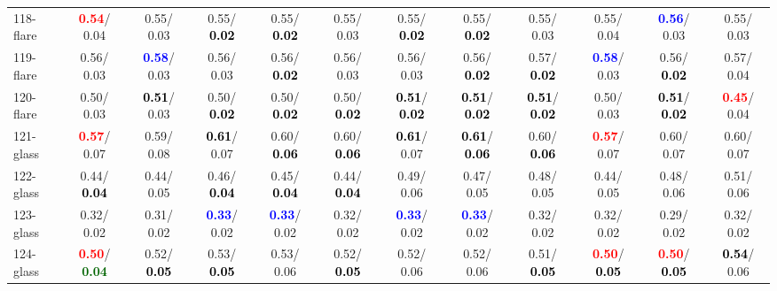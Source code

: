 \begin{table}[h]
\begin{center}
{\begin{tabular}{lc|c|c|c|c|c|c|c|c|c|c}
118-flare & \textcolor{red}{\textbf{  0.54}}/  0.04 &   0.55/  0.03 &   0.55/\textcolor{black}{\textbf{  0.02}} &   0.55/\textcolor{black}{\textbf{  0.02}} &   0.55/  0.03 &   0.55/\textcolor{black}{\textbf{  0.02}} &   0.55/\textcolor{black}{\textbf{  0.02}} &   0.55/  0.03 &   0.55/  0.04 & \textcolor{blue}{\textbf{  0.56}}/  0.03 &   0.55/  0.03 \\
119-flare &   0.56/  0.03 & \textcolor{blue}{\textbf{  0.58}}/  0.03 &   0.56/  0.03 &   0.56/\textcolor{black}{\textbf{  0.02}} &   0.56/  0.03 &   0.56/  0.03 &   0.56/\textcolor{black}{\textbf{  0.02}} &   0.57/\textcolor{black}{\textbf{  0.02}} & \textcolor{blue}{\textbf{  0.58}}/  0.03 &   0.56/\textcolor{black}{\textbf{  0.02}} &   0.57/  0.04 \\
120-flare &   0.50/  0.03 & \textcolor{black}{\textbf{  0.51}}/  0.03 &   0.50/\textcolor{black}{\textbf{  0.02}} &   0.50/\textcolor{black}{\textbf{  0.02}} &   0.50/\textcolor{black}{\textbf{  0.02}} & \textcolor{black}{\textbf{  0.51}}/\textcolor{black}{\textbf{  0.02}} & \textcolor{black}{\textbf{  0.51}}/\textcolor{black}{\textbf{  0.02}} & \textcolor{black}{\textbf{  0.51}}/\textcolor{black}{\textbf{  0.02}} &   0.50/  0.03 & \textcolor{black}{\textbf{  0.51}}/\textcolor{black}{\textbf{  0.02}} & \textcolor{red}{\textbf{  0.45}}/  0.04 \\
121-glass & \textcolor{red}{\textbf{  0.57}}/  0.07 &   0.59/  0.08 & \textcolor{black}{\textbf{  0.61}}/  0.07 &   0.60/\textcolor{black}{\textbf{  0.06}} &   0.60/\textcolor{black}{\textbf{  0.06}} & \textcolor{black}{\textbf{  0.61}}/  0.07 & \textcolor{black}{\textbf{  0.61}}/\textcolor{black}{\textbf{  0.06}} &   0.60/\textcolor{black}{\textbf{  0.06}} & \textcolor{red}{\textbf{  0.57}}/  0.07 &   0.60/  0.07 &   0.60/  0.07 \\
122-glass &   0.44/\textcolor{black}{\textbf{  0.04}} &   0.44/  0.05 &   0.46/\textcolor{black}{\textbf{  0.04}} &   0.45/\textcolor{black}{\textbf{  0.04}} &   0.44/\textcolor{black}{\textbf{  0.04}} &   0.49/  0.06 &   0.47/  0.05 &   0.48/  0.05 &   0.44/  0.05 &   0.48/  0.06 &   0.51/  0.06 \\
123-glass &   0.32/  0.02 &   0.31/  0.02 & \textcolor{blue}{\textbf{  0.33}}/  0.02 & \textcolor{blue}{\textbf{  0.33}}/  0.02 &   0.32/  0.02 & \textcolor{blue}{\textbf{  0.33}}/  0.02 & \textcolor{blue}{\textbf{  0.33}}/  0.02 &   0.32/  0.02 &   0.32/  0.02 &   0.29/  0.02 &   0.32/  0.02 \\
124-glass & \textcolor{red}{\textbf{  0.50}}/\textcolor{darkgreen}{\textbf{  0.04}} &   0.52/\textcolor{black}{\textbf{  0.05}} &   0.53/\textcolor{black}{\textbf{  0.05}} &   0.53/  0.06 &   0.52/\textcolor{black}{\textbf{  0.05}} &   0.52/  0.06 &   0.52/  0.06 &   0.51/\textcolor{black}{\textbf{  0.05}} & \textcolor{red}{\textbf{  0.50}}/\textcolor{black}{\textbf{  0.05}} & \textcolor{red}{\textbf{  0.50}}/\textcolor{black}{\textbf{  0.05}} & \textcolor{black}{\textbf{  0.54}}/  0.06 \\ \hline

\end{tabular}}
\end{center}
\end{table}
